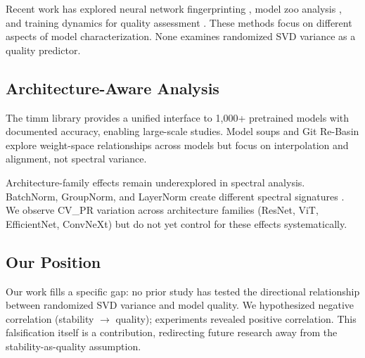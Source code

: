 Recent work has explored neural network fingerprinting \citep{eilertsen2020classifying}, model zoo analysis \citep{wortsman2022model}, and training dynamics for quality assessment \citep{frankle2020linear}. These methods focus on different aspects of model characterization. None examines randomized SVD variance as a quality predictor.

\subsection{Architecture-Aware Analysis}

The timm library \citep{wightman2019pytorch} provides a unified interface to 1,000+ pretrained models with documented accuracy, enabling large-scale studies. Model soups \citep{wortsman2022model} and Git Re-Basin \citep{ainsworth2023git} explore weight-space relationships across models but focus on interpolation and alignment, not spectral variance.

Architecture-family effects remain underexplored in spectral analysis. BatchNorm, GroupNorm, and LayerNorm create different spectral signatures \citep{wu2018group}. We observe CV\_PR variation across architecture families (ResNet, ViT, EfficientNet, ConvNeXt) but do not yet control for these effects systematically.

\subsection{Our Position}

Our work fills a specific gap: no prior study has tested the directional relationship between randomized SVD variance and model quality. We hypothesized negative correlation (stability $\rightarrow$ quality); experiments revealed positive correlation. This falsification itself is a contribution, redirecting future research away from the stability-as-quality assumption.
